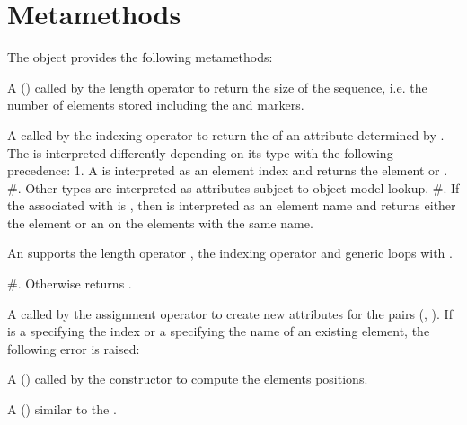 \documentclass[letterpaper,10pt,english]{sphinxmanual}
\begin{document}
\section{Metamethods}
\label{\detokenize{sequences:metamethods}}
\sphinxAtStartPar
The  object provides the following metamethods:
\begin{description}
\sphinxAtStartPar
A  () called by the length operator \sphinxcode{\sphinxupquote{\#}} to return the size of the sequence, i.e. the number of elements stored including the  and
 markers.

\sphinxAtStartPar
A   called by the indexing operator \sphinxcode{\sphinxupquote{{[}key{]}}} to return the  of an attribute determined by . The  is interpreted differently depending
on its type with the following precedence:
1. A  is interpreted as an element index and returns the element or .
\#. Other  types are interpreted as  attributes subject to object model lookup.
\#. If the  associated with  is , then  is interpreted as an element name and returns either the element or an  on the elements with the same name. %
\begin{footnote}[4]\sphinxAtStartFootnote
An  supports the length operator \sphinxcode{\sphinxupquote{\#}}, the indexing operator \sphinxcode{\sphinxupquote{{[}{]}}} and generic  loops with .
%
\end{footnote}
\#. Otherwise returns .

\sphinxAtStartPar
A   called by the assignment operator  to create new attributes for the pairs (, ).
If  is a  specifying the index or a  specifying the name of an existing element, the following error is raised:

\sphinxAtStartPar
A  () called by the constructor to compute the elements positions.

\sphinxAtStartPar
A  () similar to the  .

\end{description}
\end{document}
